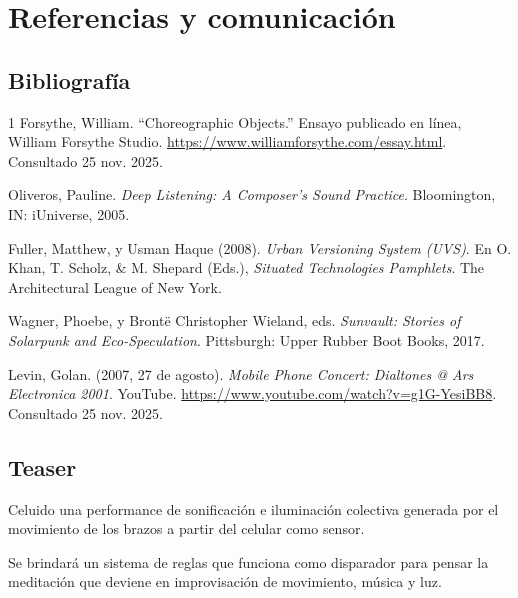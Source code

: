 \documentclass[spanish]{report}
\newcommand{\sectionsep}{1cm}
\begin{document}
\vspace{\sectionsep}
\section{Referencias y comunicación}

\subsection{Bibliografía}
\renewcommand{\refname}{}
\renewcommand{\bibname}{}
\let\oldclearpage\clearpage
\let\clearpage\relax
\vspace{-8em} 
\begin{thebibliography}{1}
Forsythe, William. ``Choreographic Objects.'' Ensayo publicado en línea, William Forsythe Studio. \url{https://www.williamforsythe.com/essay.html}. Consultado 25 nov. 2025.

Oliveros, Pauline. \textit{Deep Listening: A Composer’s Sound Practice}. Bloomington, IN: iUniverse, 2005.

Fuller, Matthew, y Usman Haque (2008). \textit{Urban Versioning System (UVS)}. En O. Khan, T. Scholz, \& M. Shepard (Eds.), \textit{Situated Technologies Pamphlets}. The Architectural League of New York.

Wagner, Phoebe, y Brontë Christopher Wieland, eds. \textit{Sunvault: Stories of Solarpunk and Eco-Speculation}. Pittsburgh: Upper Rubber Boot Books, 2017.

Levin, Golan. (2007, 27 de agosto). \textit{Mobile Phone Concert: Dialtones @ Ars Electronica 2001}. YouTube. \url{https://www.youtube.com/watch?v=g1G-YesiBB8}. Consultado 25 nov. 2025.

\end{thebibliography}
\let\clearpage\oldclearpage

\subsection{Teaser}
Celuido una performance de sonificación e iluminación colectiva generada por el movimiento de los brazos a partir del celular como sensor.

Se brindará un sistema de reglas que funciona como disparador para pensar la meditación que deviene en improvisación de movimiento, música y luz.  
\end{document}
